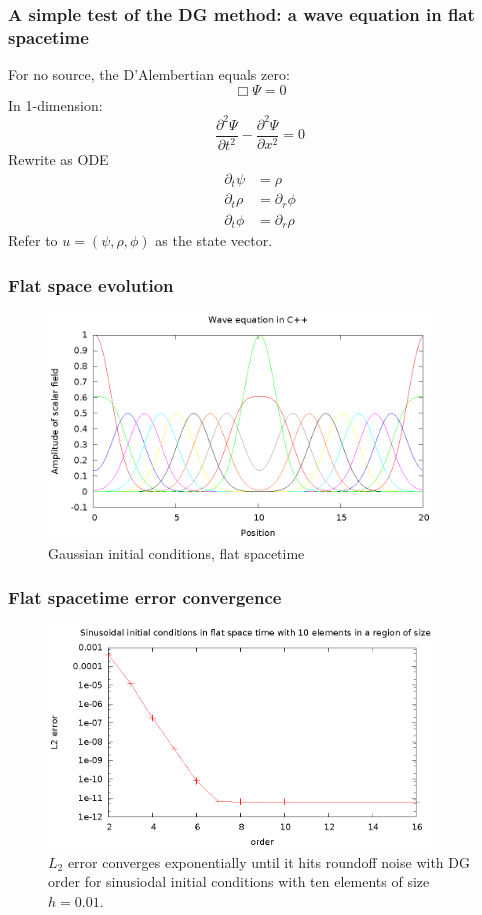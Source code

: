 \documentclass{beamer}
\begin{document}
\begin{frame}
  \frametitle{A simple test of the DG method: a wave equation in flat spacetime}
  For no source, the D'Alembertian equals zero:
  \begin{equation}
    \Box\Psi=0
  \end{equation}
  In 1-dimension:
  \begin{equation}
    \frac{\partial^2\Psi}{\partial t^2}-\frac{\partial^2\Psi}{\partial x^2}=0
  \end{equation}
  Rewrite as ODE
  \begin{eqnarray}
    \partial_t \psi &= \rho\nonumber\\
    \partial_t \rho &= \partial_r \phi\nonumber\\
    \partial_t \phi &= \partial_r \rho
  \end{eqnarray}
  Refer to $u=(\psi,\rho,\phi)$ as the state vector.
\end{frame}

\begin{frame}
  \frametitle{Flat space evolution}
  \begin{figure}
    \includegraphics[width=4.0in]{gaussWave}
    \caption{Gaussian initial conditions, flat spacetime}
  \end{figure}
\end{frame}



\begin{frame}
  \frametitle{Flat spacetime error convergence}
  \begin{figure}
    \includegraphics[width=4.0in]{sinL2WTorder}
    \caption{$L_2$ error converges exponentially until it hits roundoff noise with DG order for sinusiodal initial conditions with ten elements of size $h=0.01$.}
  \end{figure}
\end{frame}
\end{document}
